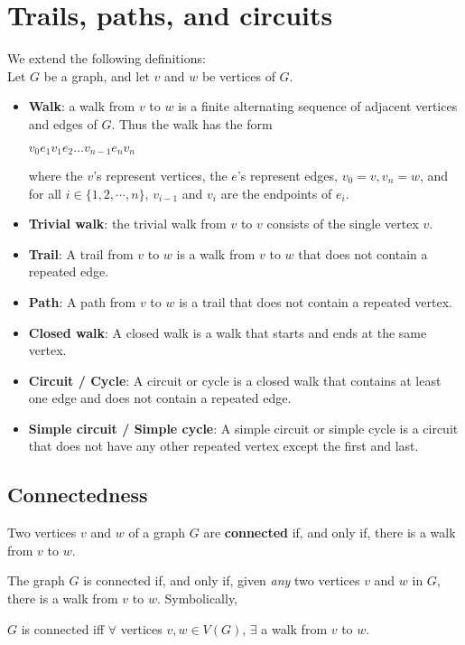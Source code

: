 \documentclass[a4paper]{article}
\begin{document}
\section{Trails, paths, and circuits}
We extend the following definitions:\\
Let $G$ be a graph, and let $v$ and $w$ be vertices of $G$.
\begin{itemize}
	\item[] \textbf{Walk}: a walk from $v$ to $w$ is a finite alternating sequence of adjacent vertices and edges of $G$. Thus the walk has the form
	\begin{center}
		$v_0e_1v_1e_2\dots v_{n-1}e_nv_n$
	\end{center}
	where the $v$'s represent vertices, the $e$'s represent edges, $v_0=v, v_n=w$, and for all $i\in\{1,2,\dotsm,n\}$, $v_{i-1}$ and $v_i$ are the endpoints of $e_i$.
	\item[] \textbf{Trivial walk}: the trivial walk from $v$ to $v$ consists of the single vertex $v$.
	\item[] \textbf{Trail}: A trail from $v$ to $w$ is a walk from $v$ to $w$ that does not contain a repeated edge.
	\item[] \textbf{Path}: A path from $v$ to $w$ is a trail that does not contain a repeated vertex.
	\item[] \textbf{Closed walk}: A closed walk is a walk that starts and ends at the same vertex.
	\item[] \textbf{Circuit / Cycle}: A circuit or cycle is a closed walk that contains at least one edge and does not contain a repeated edge.
	\item[] \textbf{Simple circuit / Simple cycle}: A simple circuit or simple cycle is a circuit that does not have any other repeated vertex except the first and last.
\end{itemize}

\subsection{Connectedness}
Two vertices $v$ and $w$ of a graph $G$ are \textbf{connected} if, and only if, there is a walk from $v$ to $w$.

The graph $G$ is connected if, and only if, given \textit{any} two vertices $v$ and $w$ in $G$, there is a walk from $v$ to $w$. Symbolically,
\begin{center}
	$G$ is connected iff $\forall$ vertices $v,w\in V(G)$, $\exists$ a walk from $v$ to $w$.
\end{center}
\end{document}
